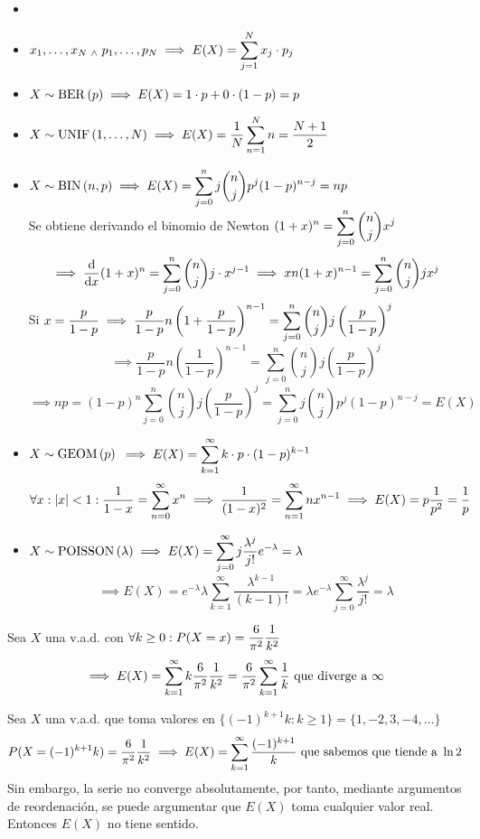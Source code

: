 \begin{ejem}
    \begin{itemize}
        \item[]
        \item $\displaystyle x_1, \dots, x_N \; _{\wedge} \; p_1, \dots, p_N \implies E(X)=\sum_{j=1}^N x_j\cdot p_j$ 
        \item $\displaystyle X\sim\operatorname{BER}\left(p\right) \implies E(X)=1\cdot p+0\cdot(1-p)=p$
        \item $\displaystyle X\sim\operatorname{UNIF}\left(1, \dots, N\right) \implies E(X)=\frac{1}{N}\sum_{n=1}^N n = \frac{N+1}{2}$
        \item $\displaystyle X\sim\operatorname{BIN}\left(n, p\right) \implies E(X)=\sum_{j=0}^n j\binom{n}{j}p^j(1-p)^{n-j}=np$ \\
        Se obtiene derivando el binomio de Newton $\displaystyle (1+x)^n=\sum_{j=0}^n \binom{n}{j} x^j$
        \[\implies \odv{}{x}(1+x)^n=\sum_{j=0}^n \binom{n}{j} j\cdot x^{j-1} \implies xn(1+x)^{n-1}=\sum_{j=0}^n \binom{n}{j} jx^{j}\]
        Si $\displaystyle x=\frac{p}{1-p} \implies \frac{p}{1-p}n\left(1+\frac{p}{1-p}\right)^{n-1}=\sum_{j=0}^n \binom{n}{j} j\left(\frac{p}{1-p}\right)^{j}$
        \[\implies \frac{p}{1-p}n\left(\frac{1}{1-p}\right)^{n-1}=\sum_{j=0}^n \binom{n}{j} j\left(\frac{p}{1-p}\right)^{j}\]
        \[\implies np=(1-p)^n\sum_{j=0}^n \binom{n}{j} j\left(\frac{p}{1-p}\right)^{j} = \sum_{j=0}^n j\binom{n}{j}p^j(1-p)^{n-j} = E(X)\]
        \item $X\sim \operatorname{GEOM}\left(p\right)$ $\displaystyle \implies E(X)=\sum_{k=1}^\infty k\cdot p\cdot(1-p)^{k-1}$
        \[\forall  x :\left|x\right|<1: \frac{1}{1-x}=\sum_{n=0}^\infty x^n\implies \frac{1}{(1-x)^2}=\sum_{n=1}^\infty nx^{n-1}\implies E(X)= p \frac{1}{p^2}=\frac{1}{p}\]
        \item $\displaystyle X\sim\operatorname{POISSON}\left(\lambda\right) \implies E(X)=\sum_{j=0}^\infty j\frac{\lambda^j}{j!}e^{-\lambda}=\lambda$
        \[\implies E(X)=e^{-\lambda}\lambda\sum_{k=1}^\infty \frac{\lambda^{k-1}}{(k-1)!}=\lambda e^{-\lambda}\sum_{j=0}^{\infty} \frac{\lambda^j}{j!}=\lambda\]
    \end{itemize}
\end{ejem}

\begin{ejem}
    Sea $X$ una v.a.d. con $\displaystyle \forall k \geq 0 : P(X=x)=\frac{6}{\pi^2}\frac{1}{k^2}$
    \[\implies E(X)=\sum_{k=1}^\infty k\frac{6}{\pi^2}\frac{1}{k^2}=\frac{6}{\pi^2}\sum_{k=1}^\infty \frac{1}{k} \text{  que diverge a } \infty\]
\end{ejem}
\begin{ejem}
    Sea $X$ una v.a.d. que toma valores en $\{(-1)^{k+1}k : k \geq 1\} = \{1, -2, 3, -4, \dots\}$
    \[P(X=(-1)^{k+1}k)=\frac{6}{\pi^2}\frac{1}{k^2} \implies E(X)=\sum_{k=1}^\infty \frac{(-1)^{k+1}}{k} \text{ que sabemos que tiende a } \ln{2}\]
    Sin embargo, la serie no converge absolutamente, por tanto, mediante argumentos de reordenación, se puede argumentar que $E(X)$ toma cualquier valor real. Entonces $E(X)$ no tiene sentido.
\end{ejem}

